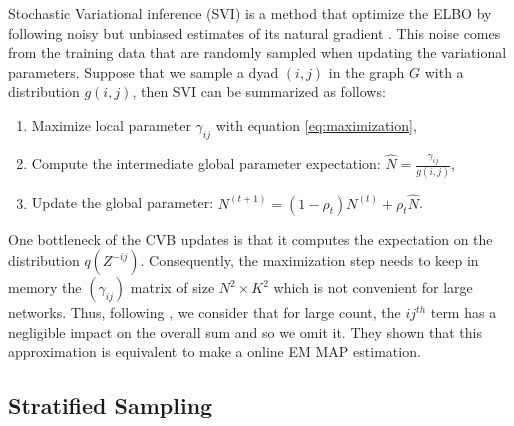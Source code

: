 Stochastic Variational inference (SVI) is a method that optimize the ELBO by following noisy but unbiased estimates of its natural gradient \cite{hoffman2013stochastic}. This noise comes from the training data that are randomly sampled when updating the variational parameters. Suppose  that we sample a dyad $(i,j)$ in the graph $G$ with a distribution $g(i,j)$, then SVI can be summarized as follows:
\begin{enumerate}
\item Maximize local parameter $\gamma_{ij}$ with equation \eqref{eq:maximization},
\item Compute the intermediate global parameter expectation: $\hat N = \frac{\gamma_{ij}}{g(i,j)}$,
\item Update the global parameter: $N^{(t+1)} = (1-\rho_t)N^{(t)} + \rho_t \hat N$.
\end{enumerate}

One bottleneck of the CVB updates is that it computes the expectation on the distribution $q(Z^{-ij})$. Consequently, the maximization step needs to keep in memory the $(\gamma_{ij})$ matrix of size $N^2\times K^2$ which is not convenient for large networks. Thus, following \cite{foulds2013stochastic}, we consider that for large count, the $ij^{th}$ term has a negligible impact on the overall sum and so we omit it. They shown that this approximation is equivalent to make a online EM MAP estimation.

\subsection{Stratified Sampling}
\label{sec:sampling}

